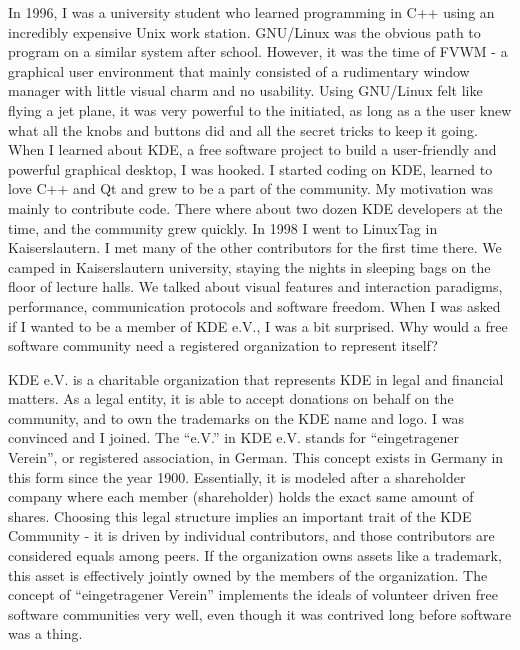 

\noindent{}In 1996, I was a university student who learned programming
in C++ using an incredibly expensive Unix work station. GNU/Linux was the
obvious path to program on a similar system after school. However, it
was the time of FVWM - a graphical user environment that mainly
consisted of a rudimentary window manager with little visual charm
and no usability. Using GNU/Linux felt like flying a jet plane, it was
very powerful to the 
initiated, as long as a the user knew what all the knobs and buttons
did and all the secret tricks to keep it going. When I learned about
KDE, a free software project to build a 
user-friendly and powerful graphical desktop, I was hooked. I
started coding on KDE, learned to love C++ and Qt and grew to be a
part of the community. My motivation was mainly to contribute
code. There where about two dozen KDE developers at the 
time, and the community grew quickly. In 1998 I went to LinuxTag in
Kaiserslautern. I met many of the other contributors for the first
time there. We camped in Kaiserslautern university, staying the nights
in sleeping bags on the floor of lecture halls. We talked about
visual features and interaction paradigms, performance, communication
protocols and software freedom. When I was asked if I wanted to be a
member of KDE e.V., I was a bit surprised. Why would a free software
community need a registered organization to represent itself?

KDE e.V. is a charitable organization that represents KDE
in legal and financial matters. As a legal entity, it is able to 
accept donations on behalf on the community, and to own the trademarks
on the KDE name and logo. I was convinced and I joined. The ``e.V.''
in KDE e.V. stands for ``eingetragener Verein'', or registered
association, in German. This concept exists in Germany in this form
since the year 1900. Essentially, it is modeled after a shareholder
company where each member (shareholder) holds the exact same amount of
shares. Choosing this legal structure implies an important trait of the
KDE Community - it is driven by individual contributors, and those
contributors are considered equals among peers. If the organization
owns assets like a trademark, this asset is effectively jointly owned
by the members of the organization. The concept of ``eingetragener
Verein'' implements the ideals of volunteer driven free software
communities very well, even though it was contrived long before
software was a thing.

